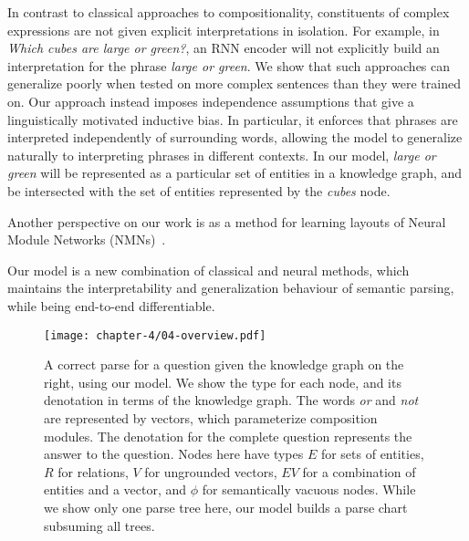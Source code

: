 \documentclass[main.tex]{subfiles}
\begin{document}
In contrast to classical approaches to compositionality, constituents of complex expressions are not given explicit interpretations in isolation.
For example, in \emph{Which cubes are large or green?}, an RNN encoder will not explicitly build an interpretation for the phrase \emph{large or green}.
We show that such approaches can generalize poorly when tested on more complex sentences than they were trained on.
Our approach instead imposes independence assumptions that give a linguistically motivated inductive bias. In particular, it enforces that phrases are interpreted independently of surrounding words, allowing the model to generalize naturally to interpreting phrases in different contexts. In our model, \emph{large or green} will be represented as a particular set of entities in a knowledge graph, and be intersected with the set of entities represented by the \emph{cubes} node.

Another perspective on our work is as a method for learning layouts of Neural Module Networks (NMNs)~\cite{nmn-2016}.

Our model is a new combination of classical and neural methods, which maintains the interpretability and generalization behaviour of semantic parsing, while being end-to-end differentiable.

\begin{figure}[tb]
    \centering
    \texttt{[image: chapter-4/04-overview.pdf]}
    \caption{{ A correct parse for a question given the knowledge graph on the right, using our model. We show the type for each node, and its denotation in terms of the knowledge graph. The words \emph{or} and \emph{not} are represented by vectors, which parameterize composition modules. The denotation for the complete question represents the answer to the question.
    Nodes here have types $E$ for sets of entities, $R$ for relations, $V$ for ungrounded vectors, $EV$ for a combination of entities and a vector, and $\phi$ for semantically vacuous nodes.
    While we show only one parse tree here, our model builds a parse chart subsuming all trees.} }
    \label{fig:04-overview}
\end{figure}

\biblio
\end{document}
